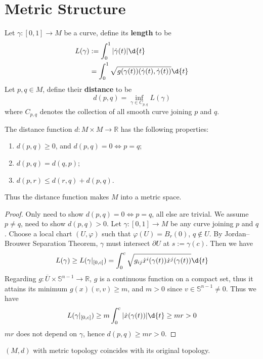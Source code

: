 \section{Metric Structure}

\begin{defn}
    Let $\gamma:[0,1]\to M$ be a curve, define its \textbf{length} to be
    \begin{align*}
        L(\gamma)&:=\int_0^1|\dot{\gamma}(t)|\d{t}\\
        &=\int_0^1\sqrt{g(\gamma(t))(\dot{\gamma}(t),\dot{\gamma}(t))}\d{t}
    \end{align*}
    Let $p,q\in M$, define their \textbf{distance} to be
    \[d(p,q)=\inf_{\gamma\in C_{p,q}}L(\gamma)\]
    where $C_{p,q}$ denotes the collection of all smooth curve joining $p$ and $q$.
\end{defn}

\begin{prop}
    The distance function $d:M\times M\to\mathbb{R}$ has the following properties:
    \begin{enumerate}[(1)]
        \item $d(p,q)\geq 0$, and $d(p,q)=0\iff p=q$;
        \item $d(p,q)=d(q,p)$;
        \item $d(p,r)\leq d(r,q)+d(p,q)$.
    \end{enumerate}
    Thus the distance function makes $M$ into a metric space.
\end{prop}
\begin{proof}
    Only need to show $d(p,q)=0\iff p=q$, all else are trivial.
    We assume $p\neq q$, need to show $d(p,q)>0$.
    Let $\gamma:[0,1]\to M$ be any curve joining $p$ and $q$.
    Choose a local chart $(U,\varphi)$ such that $\varphi(U)=B_r(0)$, $q\notin U$.
    By Jordan--Brouwer Separation Theorem, $\gamma$ must intersect $\partial{U}$ at $s:=\gamma(c)$.
    Then we have
    \[L(\gamma)\geq L(\gamma|_{[0,c]})=\int_0^c\sqrt{g_{ij}\dot{x}^i(\gamma(t))\dot{x}^j(\gamma(t))}\d{t}\]
    Regarding $g:\overline{U}\times\mathbb{S}^{n-1}\to\mathbb{R}$, $g$ is a continuous function on a compact set, thus it attains its minimum $g(x)(v,v)\geq m$, and $m>0$ since $v\in\mathbb{S}^{n-1}\neq 0$.
    Thus we have
    \[L(\gamma|_{[0,c]})\geq m\int_0^c|\dot{x}(\gamma(t))|\d{t}\geq mr>0\]
    $mr$ does not depend on $\gamma$, hence $d(p,q)\geq mr>0$.
\end{proof}

\begin{prop}
    $(M,d)$ with metric topology coincides with its original topology.
\end{prop}


